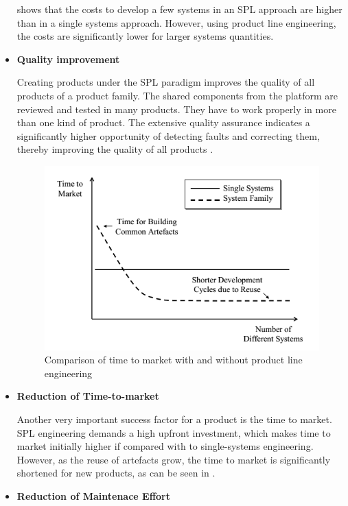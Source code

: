 \begin{itemize}
 shows that the costs to develop a few systems in an \ac{SPL} approach are higher than in a 
single systems approach. However, using product line engineering, the costs are significantly lower for larger 
systems quantities. 

\item \textbf{Quality improvement}

Creating products under the \ac{SPL} paradigm improves the quality of all products of a product family. 
The shared components from the platform are reviewed and tested in many products. They have to work properly in 
more than one kind of product. The extensive quality assurance indicates a significantly higher opportunity of 
detecting faults and correcting them, thereby improving the quality of all products \citep{Pohl2005}.

\begin{figure}[htp]
\begin{center}
  \includegraphics[width=11cm]{chapters/background/img/spl-timetomarket.png}
  \caption[Comparison of time to market with and without product line
  engineering]{Comparison of time to market with and without product line
  engineering \citep{Pohl2005}}
  \label{fg:spl-timetomarket}
\end{center}
\end{figure}

\item \textbf{Reduction of Time-to-market}

Another very important success factor for a product is the time to market.
\ac{SPL} engineering demands a high upfront investment, which makes time to
market initially higher if compared with to single-systems engineering. However, as the reuse of artefacts grow, 
the time to market is significantly shortened for new products, as can be seen
in .
\item \textbf{Reduction of Maintenace Effort}


\end{itemize}
